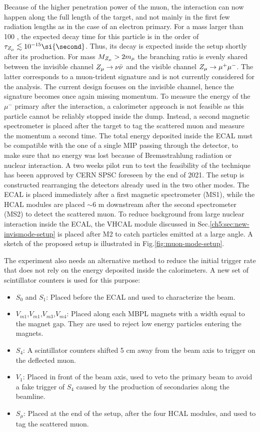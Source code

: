 Because of the higher penetration power of the muon, the interaction can now happen along the full length of the target, and not mainly in the first few radiation lengths as in the case of an electron primary.
For a mass larger than 100 \mev, the expected decay time for this particle is in the order of $\tau_{\DMU} \lesssim 10^{-15} \si{\second}$. Thus, its decay is expected inside the setup shortly after its production. For mass $M_{Z_{\mu}} > 2 m_{\mu}$ the branching ratio is evenly shared between the invisible channel $Z_{\mu} \to \nu \bar{\nu}$ and the visible channel $Z_{\mu} \to \mu^+ \mu^-$. The latter corresponds to a muon-trident signature and is not currently considered for the analysis. The current design focuses on the invisible channel, hence the signature becomes once again missing momentum. To measure the energy of the $\mu^-$ primary after the interaction, a calorimeter approach is not feasible as this particle cannot be reliably stopped inside the dump. Instead, a second magnetic spectrometer is placed after the target to tag the scattered muon and measure the momentum a second time. The total energy deposited inside the ECAL must be compatible with the one of a single MIP passing through the detector, to make sure that no energy was lost because of Bremsstrahlung radiation or nuclear interaction. A two weeks pilot run to test the feasibility of the technique has beeen approved by CERN SPSC foreseen by the end of 2021. The setup is constructed rearranging the detectors already used in the two other modes. The ECAL is placed immediately after a first magnetic spectrometer (MS1), while the HCAL modules are placed $\sim$6 \si{\meter} downstream after the second spectrometer (MS2) to detect the scattered muon. To reduce background from large nuclear interaction inside the ECAL, the VHCAL module discussed in Sec.\ref{ch5:sec:new-invismode-setup} is placed after M2 to catch particles emitted at a large angle. A sketch of the proposed setup is illustrated in Fig.\ref{fig:muon-mode-setup}.

The experiment also needs an alternative method to reduce the initial trigger rate that does not rely on the energy deposited inside the calorimeters. A new set of scintillator counters is used for this purpose:
\begin{itemize}
\item $S_0$ and $S_1$: Placed before the ECAL and used to characterize the beam.
\item $V_{m1}$,$V_{m1}$,$V_{m3}$,$V_{m4}$: Placed along each MBPL magnets with a width equal to the magnet gap. They are used to reject low energy particles entering the magnets.
\item $S_4$: A scintillator counters shifted 5 \si{\centi\meter} away from the beam axis to trigger on the deflected muon.
\item $V_1$: Placed in front of the beam axis, used to veto the primary beam to avoid a fake trigger of $S_4$ caused by the production of secondaries along the beamline.
\item $S_{\mu}$: Placed at the end of the setup, after the four HCAL modules, and used to tag the scattered muon.
\end{itemize}

